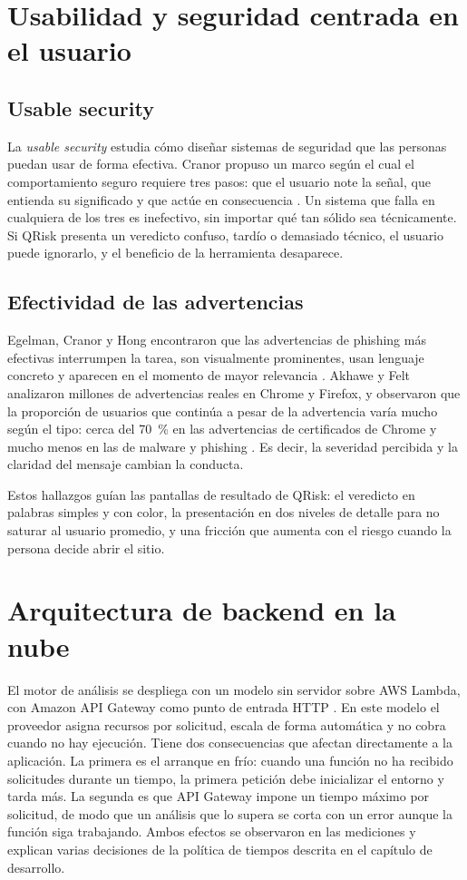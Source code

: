\section{Usabilidad y seguridad centrada en el usuario}

\subsection{Usable security}

La \emph{usable security} estudia cómo diseñar sistemas de seguridad que las personas puedan usar de forma efectiva. Cranor propuso un marco según el cual el comportamiento seguro requiere tres pasos: que el usuario note la señal, que entienda su significado y que actúe en consecuencia \cite{cranor2008framework}. Un sistema que falla en cualquiera de los tres es inefectivo, sin importar qué tan sólido sea técnicamente. Si QRisk presenta un veredicto confuso, tardío o demasiado técnico, el usuario puede ignorarlo, y el beneficio de la herramienta desaparece.

\subsection{Efectividad de las advertencias}

Egelman, Cranor y Hong encontraron que las advertencias de phishing más efectivas interrumpen la tarea, son visualmente prominentes, usan lenguaje concreto y aparecen en el momento de mayor relevancia \cite{egelman2008warned}. Akhawe y Felt analizaron millones de advertencias reales en Chrome y Firefox, y observaron que la proporción de usuarios que continúa a pesar de la advertencia varía mucho según el tipo: cerca del 70~\% en las advertencias de certificados de Chrome y mucho menos en las de malware y phishing \cite{akhawe2013alice}. Es decir, la severidad percibida y la claridad del mensaje cambian la conducta.

Estos hallazgos guían las pantallas de resultado de QRisk: el veredicto en palabras simples y con color, la presentación en dos niveles de detalle para no saturar al usuario promedio, y una fricción que aumenta con el riesgo cuando la persona decide abrir el sitio.

\section{Arquitectura de backend en la nube}

El motor de análisis se despliega con un modelo sin servidor sobre AWS Lambda, con Amazon API Gateway como punto de entrada HTTP \cite{aws_lambda_dg}. En este modelo el proveedor asigna recursos por solicitud, escala de forma automática y no cobra cuando no hay ejecución. Tiene dos consecuencias que afectan directamente a la aplicación. La primera es el arranque en frío: cuando una función no ha recibido solicitudes durante un tiempo, la primera petición debe inicializar el entorno y tarda más. La segunda es que API Gateway impone un tiempo máximo por solicitud, de modo que un análisis que lo supera se corta con un error aunque la función siga trabajando. Ambos efectos se observaron en las mediciones y explican varias decisiones de la política de tiempos descrita en el capítulo de desarrollo.
